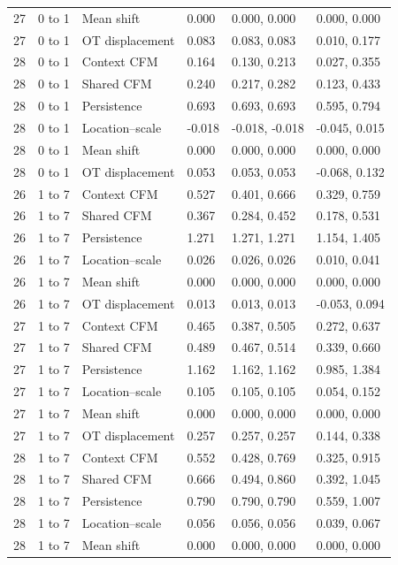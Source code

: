 \documentclass[10pt,a4paper]{article}
\begin{document}
{{\begin{longtable}{@{}p{14mm}p{18mm}p{36mm}p{24mm}p{32mm}p{39mm}@{}}
27 & 0 to 1 & Mean shift & 0.000 & 0.000, 0.000 & 0.000, 0.000\\
27 & 0 to 1 & OT displacement & 0.083 & 0.083, 0.083 & 0.010, 0.177\\
28 & 0 to 1 & Context CFM & 0.164 & 0.130, 0.213 & 0.027, 0.355\\
28 & 0 to 1 & Shared CFM & 0.240 & 0.217, 0.282 & 0.123, 0.433\\
28 & 0 to 1 & Persistence & 0.693 & 0.693, 0.693 & 0.595, 0.794\\
28 & 0 to 1 & Location--scale & -0.018 & -0.018, -0.018 & -0.045, 0.015\\
28 & 0 to 1 & Mean shift & 0.000 & 0.000, 0.000 & 0.000, 0.000\\
28 & 0 to 1 & OT displacement & 0.053 & 0.053, 0.053 & -0.068, 0.132\\
26 & 1 to 7 & Context CFM & 0.527 & 0.401, 0.666 & 0.329, 0.759\\
26 & 1 to 7 & Shared CFM & 0.367 & 0.284, 0.452 & 0.178, 0.531\\
26 & 1 to 7 & Persistence & 1.271 & 1.271, 1.271 & 1.154, 1.405\\
26 & 1 to 7 & Location--scale & 0.026 & 0.026, 0.026 & 0.010, 0.041\\
26 & 1 to 7 & Mean shift & 0.000 & 0.000, 0.000 & 0.000, 0.000\\
26 & 1 to 7 & OT displacement & 0.013 & 0.013, 0.013 & -0.053, 0.094\\
27 & 1 to 7 & Context CFM & 0.465 & 0.387, 0.505 & 0.272, 0.637\\
27 & 1 to 7 & Shared CFM & 0.489 & 0.467, 0.514 & 0.339, 0.660\\
27 & 1 to 7 & Persistence & 1.162 & 1.162, 1.162 & 0.985, 1.384\\
27 & 1 to 7 & Location--scale & 0.105 & 0.105, 0.105 & 0.054, 0.152\\
27 & 1 to 7 & Mean shift & 0.000 & 0.000, 0.000 & 0.000, 0.000\\
27 & 1 to 7 & OT displacement & 0.257 & 0.257, 0.257 & 0.144, 0.338\\
28 & 1 to 7 & Context CFM & 0.552 & 0.428, 0.769 & 0.325, 0.915\\
28 & 1 to 7 & Shared CFM & 0.666 & 0.494, 0.860 & 0.392, 1.045\\
28 & 1 to 7 & Persistence & 0.790 & 0.790, 0.790 & 0.559, 1.007\\
28 & 1 to 7 & Location--scale & 0.056 & 0.056, 0.056 & 0.039, 0.067\\
28 & 1 to 7 & Mean shift & 0.000 & 0.000, 0.000 & 0.000, 0.000\\

\end{longtable}}}
\end{document}
